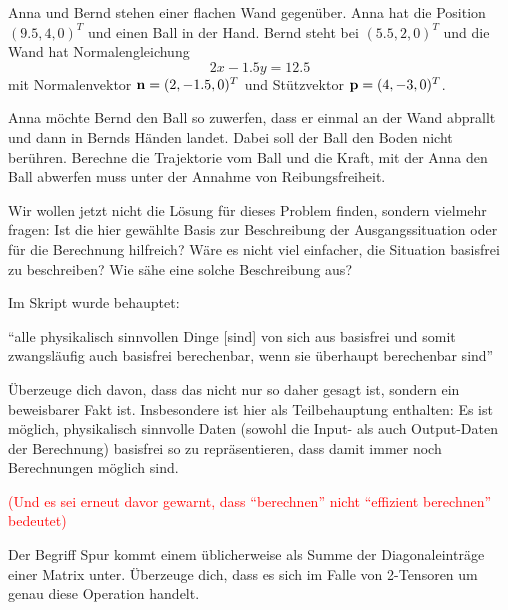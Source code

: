\begin{sheet}
\begin{problem}[title={Vom Sinn und Unsinn der Basen}]
Anna und Bernd stehen einer flachen Wand gegenüber. Anna hat die Position $(9.5, 4,0)^T$ und  einen Ball in der Hand. Bernd steht bei $(5.5, 2, 0)^T$ und die Wand hat Normalengleichung \[2x-1.5y = 12.5\] mit Normalenvektor $\mathbf{n}=(2,-1.5,0)^T$ und Stützvektor $\mathbf{p}=(4,-3,0)^T$. 
        
Anna möchte Bernd den Ball so zuwerfen, dass er einmal an der Wand abprallt und dann in Bernds Händen landet. Dabei soll der Ball den Boden nicht berühren. Berechne die Trajektorie vom Ball und die Kraft, mit der Anna den Ball abwerfen muss unter der Annahme von Reibungsfreiheit.

\medbreak
Wir wollen jetzt nicht die Lösung für dieses Problem finden, sondern vielmehr fragen: Ist die hier gewählte Basis zur Beschreibung der Ausgangssituation oder für die Berechnung hilfreich? Wäre es nicht viel einfacher, die Situation basisfrei zu beschreiben? Wie sähe eine solche Beschreibung aus?
\end{problem}

\begin{problem}[title={Wilde Behauptungen}, difficulty={schwer}]
Im Skript wurde behauptet:

\enquote{alle physikalisch sinnvollen Dinge [sind] von sich aus basisfrei und somit zwangsläufig auch basisfrei berechenbar, wenn sie überhaupt berechenbar sind}

Überzeuge dich davon, dass das nicht nur so daher gesagt ist, sondern ein beweisbarer Fakt ist. Insbesondere ist hier als Teilbehauptung enthalten: Es ist möglich, physikalisch sinnvolle Daten (sowohl die Input- als auch Output-Daten der Berechnung) basisfrei so zu repräsentieren, dass damit immer noch Berechnungen möglich sind.

\medbreak
\textcolor{red}{(Und es sei erneut davor gewarnt, dass \enquote{berechnen} nicht \enquote{effizient berechnen} bedeutet)}
\end{problem}

\begin{problem}[title={Warum heißt das Spur?}]
	Der Begriff Spur kommt einem üblicherweise als Summe der Diagonaleinträge einer Matrix unter. Überzeuge dich, dass es sich im Falle von 2-Tensoren um genau diese Operation handelt.
\end{problem}

\end{sheet}